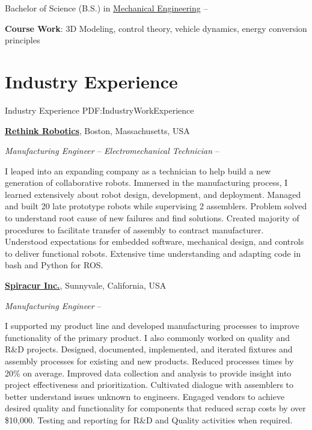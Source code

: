 \documentclass[letterpaper,10pt,oneside]{article}
\newcommand{\BreakLine}{
    \hspace*{-3.2cm}
    \noindent\rule{0.98\textwidth}{0.4pt}
}
\begin{document}
\begin{body}
\GapNoBreak
\BulletItem
Bachelor of Science (B.S.) in
\href{http://www.me.berkeley.edu/}
{Mechanical Engineering}
\hfill
{} --
\begin{detail}
\SubBulletItem
\textbf{Course Work}: 3D Modeling, control theory, vehicle dynamics, energy conversion principles
\end{detail}


\section
{Industry Experience}
{Industry Experience}
{PDF:IndustryWorkExperience}

\href{http://www.rethinkrobotics.com/}
{\textbf{Rethink Robotics}},
Boston, Massachusetts, USA

\GapNoBreak
\textit{Manufacturing Engineer}
\hfill
{} --
\newline
\textit{Electromechanical Technician}
\hfill
{} --
\begin{detail}
I leaped into an expanding company as a technician to help build a new generation of collaborative robots.  Immersed in the manufacturing process, I learned extensively about robot design, development, and deployment.
\SubBulletItem
Managed and built 20 late prototype robots while supervising 2 assemblers.
\SubBulletItem
Problem solved to understand root cause of new failures and find solutions.
\SubBulletItem
Created majority of procedures to facilitate transfer of assembly to contract manufacturer.
\SubBulletItem
Understood expectations for embedded software, mechanical design, and controls to deliver functional robots.
\SubBulletItem
Extensive time understanding and adapting code in bash and Python for ROS.  
\end{detail}
\BigGap
\href{http://www.acelity.com/products/snap-therapy-system}
{\textbf{Spiracur Inc.}},
Sunnyvale, California, USA

\GapNoBreak
\textit{Manufacturing Engineer}
\hfill
{} --

\begin{detail}
I supported my product line and developed manufacturing processes to improve functionality of the primary product.
I also commonly worked on quality and R\&D projects.
\SubBulletItem
Designed, documented, implemented, and iterated fixtures and assembly processes for existing and new products.  Reduced processes times by 20\% on average.  Improved data collection and analysis to provide insight into project effectiveness and prioritization.
\SubBulletItem
Cultivated dialogue with assemblers to better understand issues unknown to engineers.
\SubBulletItem
Engaged vendors to achieve desired quality and functionality for components that reduced scrap costs by over \$10,000.
\SubBulletItem
Testing and reporting for R\&D and Quality activities when required.  


\end{detail}
\end{body}
\end{document}
